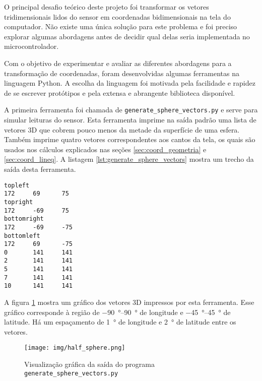 \documentclass[brazil,pagestart=firstchapter]{abnt}
\begin{document}
O principal desafio teórico deste projeto foi transformar os vetores
tridimensionais lidos do sensor em coordenadas bidimensionais na tela do
computador. Não existe uma única solução para este problema e foi preciso
explorar algumas abordagens antes de decidir qual delas seria implementada
no microcontrolador.

Com o objetivo de experimentar e avaliar as diferentes abordagens para a
transformação de coordenadas, foram desenvolvidas algumas ferramentas
na linguagem Python. A escolha da linguagem foi motivada pela facilidade e
rapidez de se escrever protótipos e pela extensa e abrangente biblioteca
disponível.

A primeira ferramenta foi chamada de \texttt{generate\_sphere\_vectors.py} e
serve para simular leituras do sensor. Esta ferramenta imprime na saída
padrão uma lista de vetores 3D que cobrem pouco menos da metade da
superfície de uma esfera. Também imprime quatro vetores correspondentes aos
cantos da tela, os quais são usados nos cálculos explicados nas seções
\ref{sec:coord_geometria} e \ref{sec:coord_lineq}. A listagem
\ref{lst:generate_sphere_vectors} mostra um trecho da saída desta
ferramenta.

\begin{lstlisting}[numbers=none, float=h, label={lst:generate_sphere_vectors},
caption={Primeiras linhas da saída do programa \texttt{generate\_sphere\_vectors.py}}
]
topleft
172     69      75
topright
172     -69     75
bottomright
172     -69     -75
bottomleft
172     69      -75
0       141     141
2       141     141
5       141     141
7       141     141
10      141     141
\end{lstlisting}

A figura \ref{fig:half_sphere} mostra um gráfico dos vetores 3D
impressos por esta ferramenta. Esse gráfico corresponde à região de
\SIrange{-90}{90}{\degree} de longitude e \SIrange{-45}{45}{\degree} de
latitude. Há um espaçamento de \SI{1}{\degree} de longitude e
\SI{2}{\degree} de latitude entre os vetores.

\begin{figure}[h]
\centering
\texttt{[image: img/half\_sphere.png]}
\caption{Visualização gráfica da saída do programa \texttt{generate\_sphere\_vectors.py}}
\label{fig:half_sphere}
\end{figure}
\end{document}
